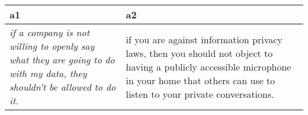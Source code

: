 \centering
\caption{
              A pair of arguments from \textbf{IBM\_ArgQ} , 
              for the prompt topic: ``We should support information privacy 
              laws''. 
              }
\begin{tabular}{p{6cm}|p{6cm}}
\toprule
                                                                                                                    a1 &                                                                                                                                                                                            a2 \\
\midrule
\textit{if a company is not willing to openly say what they are going to do 
with my data, they shouldn't be allowed to do it.} &  if you are against 
information privacy laws, then you should not object to having a publicly 
accessible microphone in your home that others can use to listen to your 
private conversations. \\
\bottomrule
\end{tabular}

